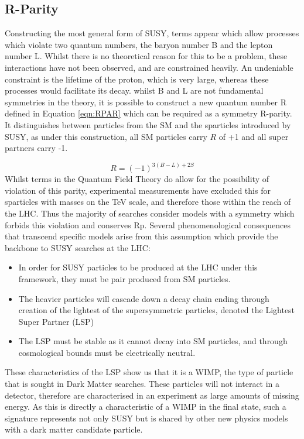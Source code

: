 \subsection{R-Parity}

Constructing the most general form of SUSY, terms appear which allow processes which violate two quantum numbers, the baryon number B and the lepton number L. Whilst there is no theoretical reason for this to be a problem, these interactions have not been observed, and are constrained heavily. An undeniable constraint is the lifetime of the proton, which is very large, whereas these processes would facilitate its decay. whilst B and L are not fundamental symmetries in the theory, it is possible to construct a new quantum number R defined in Equation \ref{eqn:RPAR} which can be required as a symmetry R-parity\cite{terning}. It distinguishes between particles from the SM and the sparticles introduced by SUSY, as under this construction, all SM particles carry $R$ of +1 and all super partners carry -1. 

\begin{equation}
R = (-1)^{3(B-L)+2S}
\label{eqn:RPAR}
\end{equation}
Whilst terms in the Quantum Field Theory do allow for the possibility of violation of this parity, experimental measurements have excluded this for sparticles with masses on the TeV scale, and therefore those within the reach of the LHC. Thus the  majority of searches consider models with a symmetry which forbids this violation and conserves Rp. Several phenomenological consequences that transcend specific models arise from this assumption which provide the backbone to SUSY searches at the LHC:

\begin{itemize}
\item{In order for SUSY particles to be produced at the LHC under this framework, they must be pair produced from SM particles.} 

\item{The heavier particles will cascade down a decay chain ending through creation of the lightest of the supersymmetric particles, denoted the Lightest Super Partner (LSP)}

\item{The LSP must be stable as it cannot decay into SM particles, and through cosmological bounds must be electrically neutral.} 
\end{itemize}
These characteristics of the LSP show us that it is a WIMP, the type of particle that is sought in Dark Matter searches.  These particles will not interact in a detector, therefore are characterised in an experiment as large amounts of missing energy. As this is directly a characteristic of a WIMP in the final state, such a signature represents not only SUSY but is shared by other new physics models with a dark matter candidate particle. 

